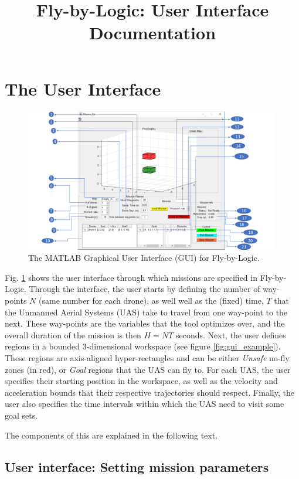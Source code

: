 \documentclass[english]{article}
\title{Fly-by-Logic: User Interface Documentation}
\begin{document}
\maketitle
\section{The User Interface}
    
    \begin{figure}[H]
		\label{fig:gui}
        \includegraphics[width=0.99\textwidth]{layout.pdf}
        \caption{The MATLAB Graphical User Interface (GUI) for Fly-by-Logic.}
    \end{figure}

Fig. \ref{fig:gui} shows the user interface through which missions are specified in Fly-by-Logic. Through the interface, the user starts by defining the number of way-points $N$ (same number for each drone), as well well as the (fixed) time, $T$ that the Unmanned Aerial Systems (UAS) take to travel from one way-point to the next. These way-points are the variables that the tool optimizes over, and the overall duration of the mission is then $H=NT$ seconds. Next, the user defines regions in a bounded 3-dimensional workspace (see figure \ref{fig:gui_example}). These regions are axis-aligned hyper-rectangles and can be either \textit{Unsafe} no-fly zones (in red), or \textit{Goal} regions that the UAS can fly to. For each UAS, the user specifies their starting position in the workspace, as well as the velocity and acceleration bounds that their respective trajectories should respect. Finally, the user also specifies the time intervals within which the UAS need to visit some goal sets. 

The components of this are explained in the following text.


\subsection{User interface: Setting mission parameters}
\end{document}
